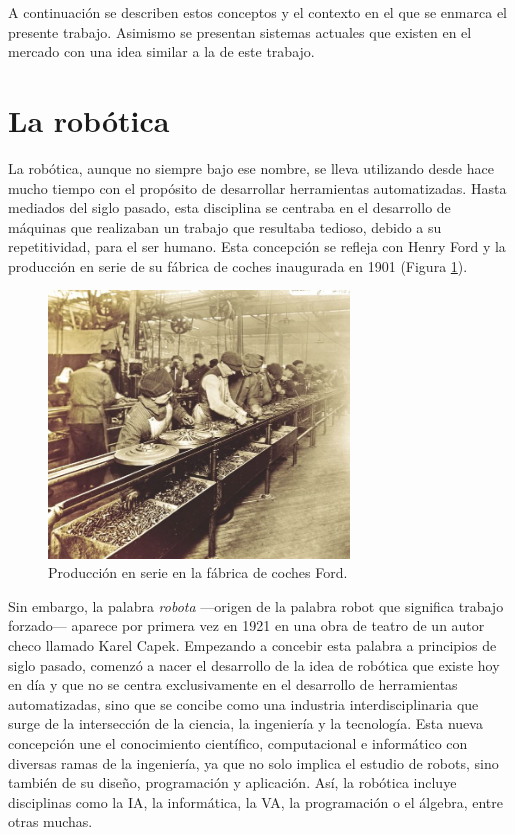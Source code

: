 A continuación se describen estos conceptos y el contexto en el que se enmarca el presente trabajo. Asimismo se presentan sistemas actuales que existen en el mercado con una idea similar a la de este trabajo.\\

\section{La robótica}
\label{sec:robotica}
La robótica, aunque no siempre bajo ese nombre, se lleva utilizando desde hace mucho tiempo con el propósito de desarrollar herramientas automatizadas.
Hasta mediados del siglo pasado, esta disciplina se centraba en el desarrollo de máquinas que realizaban un trabajo que resultaba tedioso, debido a su repetitividad, para el ser humano. Esta concepción se refleja con Henry Ford y la producción en serie de su fábrica de coches inaugurada en 1901 (Figura \ref{fig:ford}).\\
\begin{figure} [h!]
  \begin{center}
    \includegraphics[width=8cm]{figs/ford}
  \end{center}
  \caption{Producción en serie en la fábrica de coches Ford.}
  \label{fig:ford}
\end{figure}

Sin embargo, la palabra \textit{robota} ---origen de la palabra robot que significa trabajo forzado--- aparece por primera vez en 1921 en una obra de teatro de un autor checo llamado Karel Capek. Empezando a concebir esta palabra a principios de siglo pasado, comenzó a nacer el desarrollo de la idea de robótica que existe hoy en día y que no se centra exclusivamente en el desarrollo de herramientas automatizadas, sino que se concibe como una industria interdisciplinaria que surge de la intersección de la ciencia, la ingeniería y la tecnología. Esta nueva concepción une el conocimiento científico, computacional e informático con diversas ramas de la ingeniería, ya que no solo implica el estudio de robots, sino también de su diseño, programación y aplicación. Así, la robótica incluye disciplinas como la IA, la informática, la VA, la programación o el álgebra, entre otras muchas.\\

